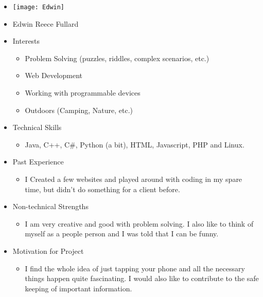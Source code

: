 
\begin{itemize}
	\item[] \texttt{[image: Edwin]}
	\item[] Edwin Reece Fullard
	\item Interests
	\begin{itemize}
		\item Problem Solving (puzzles, riddles, complex scenarios, etc.)
		\item Web Development
		\item Working with programmable devices
		\item Outdoors (Camping, Nature, etc.)
	\end{itemize}
	\item Technical Skills
	\begin{itemize}
		\item[] Java, C++, C\#, Python (a bit), HTML, Javascript, PHP and Linux.
	\end{itemize}
	\item Past Experience
	\begin{itemize}
		\item[] I Created a few websites and played around with coding in my spare time, but didn't do something for a client before.
	\end{itemize}
	\item Non-technical Strengths
	\begin{itemize}
		\item[] I am very creative and good with problem solving. I also like to think of myself as a people person and I was told that I can be funny.
	\end{itemize}
	\item Motivation for Project
	\begin{itemize}
		\item[] I find the whole idea of just tapping your phone and all the necessary things happen quite fascinating. I would also like to contribute to the safe keeping of important information.
	\end{itemize}
\end{itemize}